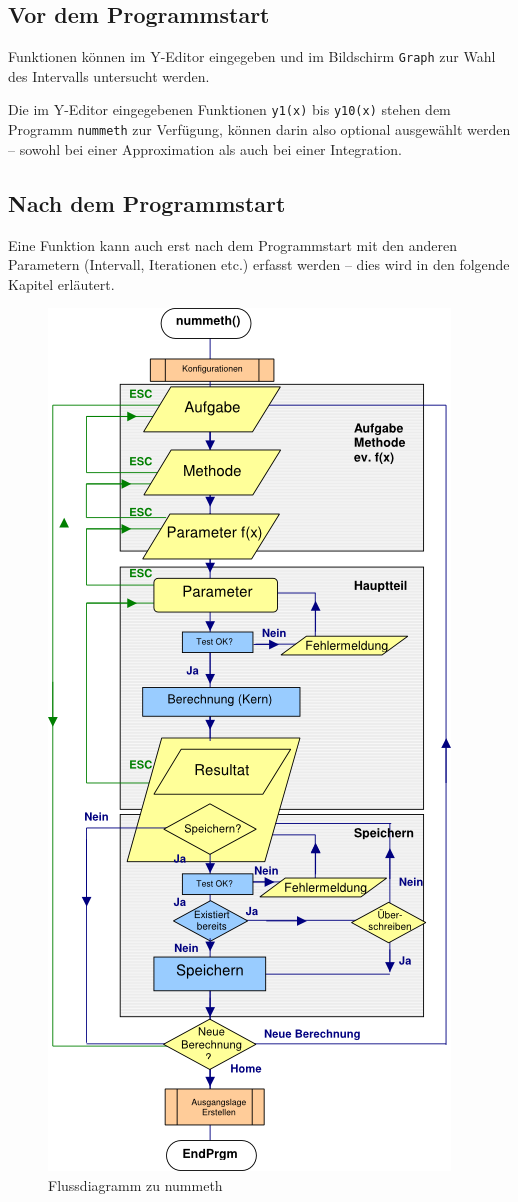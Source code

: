\documentclass[a4paper,10pt]{scrreprt}
\begin{document}
\subsection*{Vor dem Programmstart}
Funktionen k\"onnen im Y\hbox{-}Editor eingegeben und im Bildschirm \verb|Graph| zur Wahl des Intervalls untersucht werden.

Die im Y\hbox{-}Editor eingegebenen Funktionen \verb|y1(x)| bis \verb|y10(x)| stehen dem Programm \verb|nummeth| zur Verf\"ugung, k\"onnen darin also optional ausgew\"ahlt werden -- sowohl bei einer Approximation als auch bei einer Inte­gration.

\subsection*{Nach dem Programmstart}
Eine Funktion kann auch erst nach dem Programmstart mit den anderen Parametern (Intervall, Iterationen etc.) erfasst werden -- dies wird in den folgende Kapitel erl\"autert.

\newpage
\begin{figure}[h]
  \centering
  \includegraphics[height=\textheight]{img/nummeth_flowchart.png}
  \caption{Flussdiagramm zu nummeth}
  \label{fig:Flowchart}
\end{figure}
\end{document}
